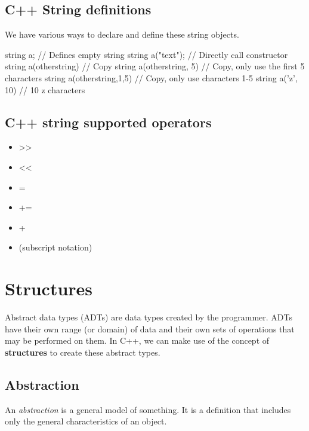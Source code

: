 \documentclass{report}
\begin{document}
    \bigbreak \noindent 
    \subsection{C++ String definitions}
    \bigbreak \noindent 
    We have various ways to declare and define these string objects.
    \bigbreak \noindent 
    
    \begin{cppcode}
string a; // Defines empty string
string a("text"); // Directly call constructor
string a(otherstring) // Copy
string a(otherstring, 5) // Copy, only use the first 5 characters
string a(otherstring,1,5) // Copy, only use characters 1-5
string a('z', 10) // 10 z characters
    \end{cppcode}
    

    \bigbreak \noindent 
    \subsection{C++ string supported operators}
    \bigbreak \noindent 
    \begin{itemize}
        \item >>
        \item <<
        \item =
        \item +=
        \item +
        \item [] (subscript notation)
    \end{itemize}

    \pagebreak \bigbreak \noindent 
    \section{\LARGE Structures}
    \bigbreak \noindent 
    \begin{concept}
        Abstract data types (ADTs) are data types created by the programmer. ADTs have their own range (or domain) of data and their own sets of operations that may be performed on them. In C++, we can make use of the concept of \textbf{structures} to create these abstract types. 
	\end{concept}

	\bigbreak \noindent 
	\subsection{Abstraction}
	\bigbreak \noindent 
	An \textit{abstraction} is a general model  of something. It is a definition that includes only the general characteristics of an object.
\end{document}
